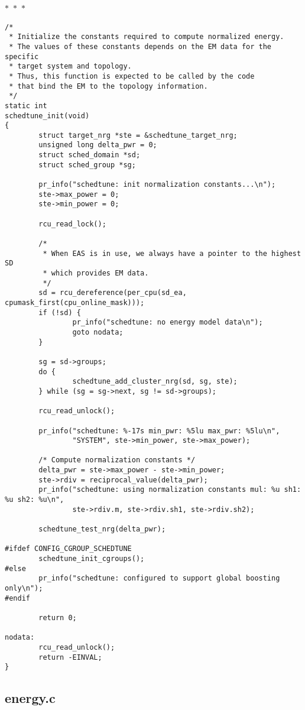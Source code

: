 \documentclass{article}
\newcommand{\divider}{{\begin{center}
  $\ast$~$\ast$~$\ast$
\end{center}}}
\begin{document}
\divider
\begin{verbatim}
/*
 * Initialize the constants required to compute normalized energy.
 * The values of these constants depends on the EM data for the specific
 * target system and topology.
 * Thus, this function is expected to be called by the code
 * that bind the EM to the topology information.
 */
static int
schedtune_init(void)
{
        struct target_nrg *ste = &schedtune_target_nrg;
        unsigned long delta_pwr = 0;
        struct sched_domain *sd;
        struct sched_group *sg;

        pr_info("schedtune: init normalization constants...\n");
        ste->max_power = 0;
        ste->min_power = 0;

        rcu_read_lock();

        /*
         * When EAS is in use, we always have a pointer to the highest SD
         * which provides EM data.
         */
        sd = rcu_dereference(per_cpu(sd_ea, cpumask_first(cpu_online_mask)));
        if (!sd) {
                pr_info("schedtune: no energy model data\n");
                goto nodata;
        }

        sg = sd->groups;
        do {
                schedtune_add_cluster_nrg(sd, sg, ste);
        } while (sg = sg->next, sg != sd->groups);

        rcu_read_unlock();

        pr_info("schedtune: %-17s min_pwr: %5lu max_pwr: %5lu\n",
                "SYSTEM", ste->min_power, ste->max_power);

        /* Compute normalization constants */
        delta_pwr = ste->max_power - ste->min_power;
        ste->rdiv = reciprocal_value(delta_pwr);
        pr_info("schedtune: using normalization constants mul: %u sh1: %u sh2: %u\n",
                ste->rdiv.m, ste->rdiv.sh1, ste->rdiv.sh2);

        schedtune_test_nrg(delta_pwr);

#ifdef CONFIG_CGROUP_SCHEDTUNE
        schedtune_init_cgroups();
#else
        pr_info("schedtune: configured to support global boosting only\n");
#endif

        return 0;

nodata:
        rcu_read_unlock();
        return -EINVAL;
}
\end{verbatim}



\subsection{energy.c}
\end{document}
